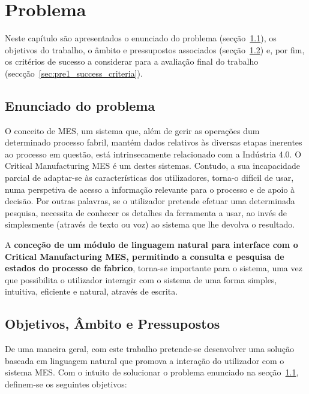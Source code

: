 \chapter{Problema}
\label{chap:pre1}

Neste capítulo são apresentados o enunciado do problema (secção~\ref{sec:pre1_problem}), os objetivos do trabalho, o âmbito e pressupostos associados (secção~\ref{sec:pre1_objectives}) e, por fim, os critérios de sucesso a considerar para a avaliação final do trabalho (seccção~\ref{sec:pre1_success_criteria}).

\section{Enunciado do problema}
\label{sec:pre1_problem}

O conceito de \gls{MES}, um sistema que, além de gerir as operações dum determinado processo fabril, mantém dados relativos às diversas etapas inerentes ao processo em questão, está intrinsecamente relacionado com a Indústria 4.0. O Critical Manufacturing \gls{MES} é um destes sistemas. Contudo, a sua incapacidade parcial de adaptar-se às características dos utilizadores, torna-o difícil de usar, numa perspetiva de acesso a informação relevante para o processo e de apoio à decisão. Por outras palavras, se o utilizador pretende efetuar uma determinada pesquisa, necessita de conhecer os detalhes da ferramenta a usar, ao invés de simplesmente  (através de texto ou voz) ao sistema que lhe devolva o resultado.

A \textbf{conceção de um módulo de linguagem natural para interface com o Critical Manufacturing \gls{MES}, permitindo a consulta e pesquisa de estados do processo de fabrico}, torna-se importante para o sistema, uma vez que possibilita o utilizador interagir com o sistema de uma forma simples, intuitiva, eficiente e natural, através de escrita.

\section{Objetivos, Âmbito e Pressupostos}
\label{sec:pre1_objectives}
De uma maneira geral, com este trabalho pretende-se desenvolver uma solução baseada em linguagem natural que promova a interação do utilizador com o sistema \gls{MES}. Com o intuito de solucionar o problema enunciado na secção~\ref{sec:pre1_problem}, definem-se os seguintes objetivos:

